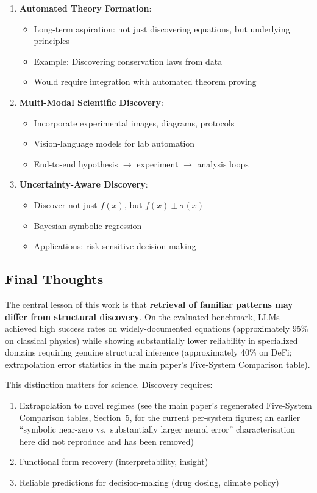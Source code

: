 \documentclass[twoside,11pt]{article}
\begin{document}
\begin{enumerate}
\item \textbf{Automated Theory Formation}:
   \begin{itemize}
   \item Long-term aspiration: not just discovering equations, but underlying principles
   \item Example: Discovering conservation laws from data
   \item Would require integration with automated theorem proving
   \end{itemize}

\item \textbf{Multi-Modal Scientific Discovery}:
   \begin{itemize}
   \item Incorporate experimental images, diagrams, protocols
   \item Vision-language models for lab automation
   \item End-to-end hypothesis $\to$ experiment $\to$ analysis loops
   \end{itemize}

\item \textbf{Uncertainty-Aware Discovery}:
   \begin{itemize}
   \item Discover not just $f(x)$, but $f(x) \pm \sigma(x)$
   \item Bayesian symbolic regression
   \item Applications: risk-sensitive decision making
   \end{itemize}
\end{enumerate}

\subsection{Final Thoughts}

The central lesson of this work is that \textbf{retrieval of familiar patterns may differ from structural discovery}\citep{kambhampati2024llms}. On the evaluated benchmark, LLMs achieved high success rates on widely-documented equations (approximately 95\% on classical physics) while showing substantially lower reliability in specialized domains requiring genuine structural inference (approximately 40\% on DeFi; extrapolation error statistics in the main paper's Five-System Comparison table).

This distinction matters for science. Discovery requires:
\begin{enumerate}
\item Extrapolation to novel regimes (see the main paper's regenerated Five-System Comparison tables, Section~5, for the current per-system figures; an earlier ``symbolic near-zero vs.\ substantially larger neural error'' characterisation here did not reproduce and has been removed)
\item Functional form recovery (interpretability, insight)
\item Reliable predictions for decision-making (drug dosing, climate policy)
\end{enumerate}
\end{document}
